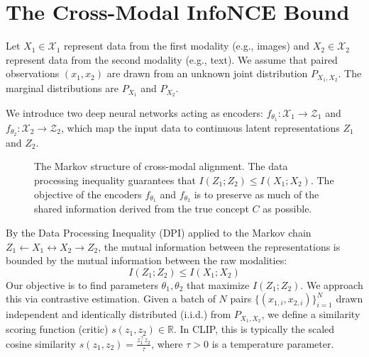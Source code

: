 \section{The Cross-Modal InfoNCE Bound}

Let $X_1 \in \mathcal{X}_1$ represent data from the first modality (e.g., images) and $X_2 \in \mathcal{X}_2$ represent data from the second modality (e.g., text). We assume that paired observations $(x_1, x_2)$ are drawn from an unknown joint distribution $P_{X_1, X_2}$. The marginal distributions are $P_{X_1}$ and $P_{X_2}$.

We introduce two deep neural networks acting as encoders: $f_{\theta_1} : \mathcal{X}_1 \to \mathcal{Z}_1$ and $f_{\theta_2} : \mathcal{X}_2 \to \mathcal{Z}_2$, which map the input data to continuous latent representations $Z_1$ and $Z_2$. 

\begin{figure}[ht]
    \centering
    \caption{The Markov structure of cross-modal alignment. The data processing inequality guarantees that $I(Z_1; Z_2) \le I(X_1; X_2)$. The objective of the encoders $f_{\theta_1}$ and $f_{\theta_2}$ is to preserve as much of the shared information derived from the true concept $C$ as possible.}
    \label{fig:clip_markov}
\end{figure}

By the Data Processing Inequality (DPI) applied to the Markov chain $Z_1 \leftarrow X_1 \leftrightarrow X_2 \rightarrow Z_2$, the mutual information between the representations is bounded by the mutual information between the raw modalities:
\begin{equation}
    I(Z_1; Z_2) \le I(X_1; X_2)
\end{equation}
Our objective is to find parameters $\theta_1, \theta_2$ that maximize $I(Z_1; Z_2)$. We approach this via contrastive estimation. Given a batch of $N$ pairs $\{(x_{1,i}, x_{2,i})\}_{i=1}^N$ drawn independent and identically distributed (i.i.d.) from $P_{X_1, X_2}$, we define a similarity scoring function (critic) $s(z_1, z_2) \in \mathbb{R}$. In CLIP, this is typically the scaled cosine similarity $s(z_1, z_2) = \frac{z_1^\top z_2}{\tau}$, where $\tau > 0$ is a temperature parameter.

